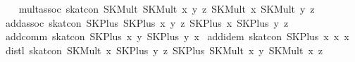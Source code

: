 \begin{isabellebody}
\isanewline
\ \ \isanewline
{}\ mult{}assoc{}\ {}skat{}con\ {}SKMult\ {}SKMult\ x\ y{}\ z{}\ {}SKMult\ x\ {}SKMult\ y\ z{}{}{}\isanewline
{}\ add{}assoc{}\ {}skat{}con\ {}SKPlus\ {}SKPlus\ x\ y{}\ z{}\ {}SKPlus\ x\ {}SKPlus\ y\ z{}{}{}\isanewline
{}\ add{}comm{}\ {}skat{}con\ {}SKPlus\ x\ y{}\ {}SKPlus\ y\ x{}{}\isanewline
{}\ add{}idem{}\ {}skat{}con\ {}SKPlus\ x\ x{}\ x{}\isanewline
{}\ distl{}\ {}skat{}con\ {}SKMult\ x\ {}SKPlus\ y\ z{}{}\ {}SKPlus\ {}SKMult\ x\ y{}\ {}SKMult\ x\ z{}{}{}\isanewline

\end{isabellebody}
